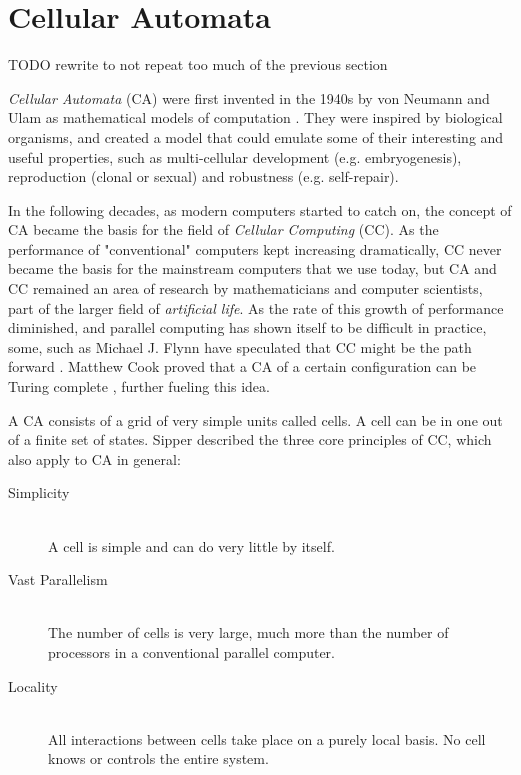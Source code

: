 \section{Cellular Automata}
TODO rewrite to not repeat too much of the previous section

\textit{Cellular Automata} (CA) were first invented in the 1940s by von Neumann and Ulam as mathematical models of computation \cite{von-neumann-1966}.
They were inspired by biological organisms,
and created a model that could emulate some of their interesting and useful properties,
such as multi-cellular development (e.g. embryogenesis), reproduction (clonal or sexual) and robustness (e.g. self-repair).

In the following decades, as modern computers started to catch on,
the concept of CA became the basis for the field of \textit{Cellular Computing} (CC).
As the performance of "conventional" computers kept increasing dramatically,
CC never became the basis for the mainstream computers that we use today,
but CA and CC remained an area of research by mathematicians and computer scientists,
part of the larger field of \textit{artificial life}.
As the rate of this growth of performance diminished,
and parallel computing has shown itself to be difficult in practice,
some, such as Michael J. Flynn have speculated that CC might be the path forward \cite{flynn-1996} .
Matthew Cook proved that a CA of a certain configuration can be Turing complete \cite{cook-2004},
further fueling this idea.

A CA consists of a grid of very simple units called cells.
A cell can be in one out of a finite set of states.
Sipper \cite{sipper-1999} described the three core principles of CC, which also apply to CA in general:

\begin{description}
    \item[Simplicity]
        ~\\
        A cell is simple and can do very little by itself.
    \item[Vast Parallelism]
        ~\\
        The number of cells is very large, much more than the number of processors in a conventional parallel computer.
    \item[Locality]
        ~\\
        All interactions between cells take place on a purely local basis.
        No cell knows or controls the entire system.
\end{description}

